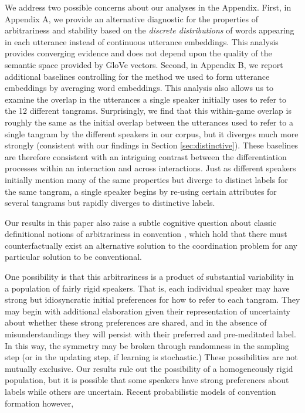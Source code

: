 \documentclass[alpha-refs]{wiley-article}
\begin{document}
We address two possible concerns about our analyses in the Appendix.
First, in Appendix A, we provide an alternative diagnostic for the properties of arbitrariness and stability based on the \emph{discrete distributions} of words appearing in each utterance instead of continuous utterance embeddings.
This analysis provides converging evidence and does not depend upon the quality of the semantic space provided by GloVe vectors.
Second, in Appendix B, we report additional baselines controlling for the method we used to form utterance embeddings by averaging word embeddings.
This analysis also allows us to examine the overlap in the utterances a single speaker initially uses to refer to the 12 different tangrams.
Surprisingly, we find that this within-game overlap is roughly the same as the initial overlap between the utterances used to refer to a single tangram by the different speakers in our corpus, but it diverges much more strongly (consistent with our findings in Section \ref{sec:distinctive}).
These baselines are therefore consistent with an intriguing contrast between the differentiation processes within an interaction and across interactions.
Just as different speakers initially mention many of the same properties but diverge to distinct labels for the same tangram, a single speaker begins by re-using certain attributes for several tangrams but rapidly diverges to distinctive labels.

Our results in this paper also raise a subtle cognitive question about classic definitional notions of arbitrariness in convention \citep{Lewis69_Convention}, which hold that there must counterfactually exist an alternative solution to the coordination problem for any particular solution to be conventional.

One possibility is that this arbitrariness is a product of substantial variability in a population of fairly rigid speakers.
That is, each individual speaker may have strong but idiosyncratic initial preferences for how to refer to each tangram. 
They may begin with additional elaboration given their representation of uncertainty about whether these strong preferences are shared, and in the absence of misunderstandings they will persist with their preferred and pre-meditated label.
In this way, the symmetry may be broken through randomness in the sampling step (or in the updating step, if learning is stochastic.)
These possibilities are not mutually exclusive.
Our results rule out the possibility of a homogeneously rigid population, but it is possible that some speakers have strong preferences about labels while others are uncertain. Recent probabilistic models of convention formation however, 
\end{document}
